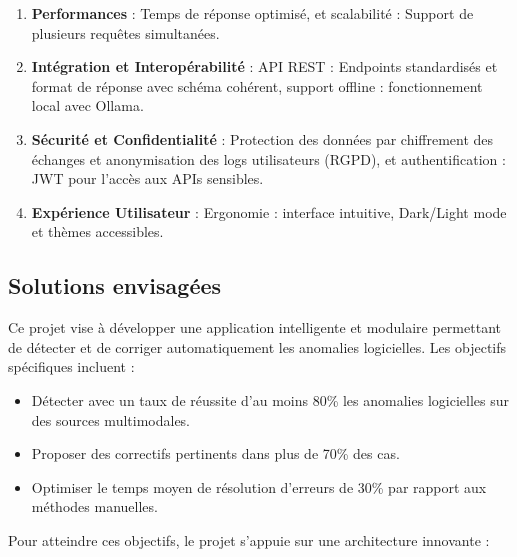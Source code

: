 \documentclass[12pt,a4paper]{report}
\begin{document}
	\begin{enumerate}
		
		\item \textbf{Performances} : Temps de réponse optimisé, et scalabilité : Support de plusieurs requêtes simultanées.
		
		\item \textbf{Intégration et Interopérabilité} : API REST : Endpoints standardisés et format de réponse avec schéma cohérent, support offline : fonctionnement local avec Ollama.
		
		\item \textbf{Sécurité et Confidentialité} : Protection des données par chiffrement des échanges et anonymisation des logs utilisateurs (RGPD), et authentification : JWT pour l’accès aux APIs sensibles.	
		
		\item \textbf{Expérience Utilisateur} : Ergonomie : interface intuitive, Dark/Light mode et thèmes accessibles.

		
	\end{enumerate}
	
	\subsection{Solutions envisagées}
	
	Ce projet vise à développer une application intelligente et modulaire permettant de détecter et de corriger automatiquement les anomalies logicielles. Les objectifs spécifiques incluent :
	
	\renewcommand{\labelitemi}{$\bullet$}
	\begin{itemize}
		\item Détecter avec un taux de réussite d'au moins 80\% les anomalies logicielles sur des sources multimodales.
		
		\item Proposer des correctifs pertinents dans plus de 70\% des cas.
		
		\item Optimiser le temps moyen de résolution d’erreurs de 30\% par rapport aux méthodes manuelles.
	\end{itemize}
	
	
	
	Pour atteindre ces objectifs, le projet s’appuie sur une architecture innovante :
	
\end{document}
